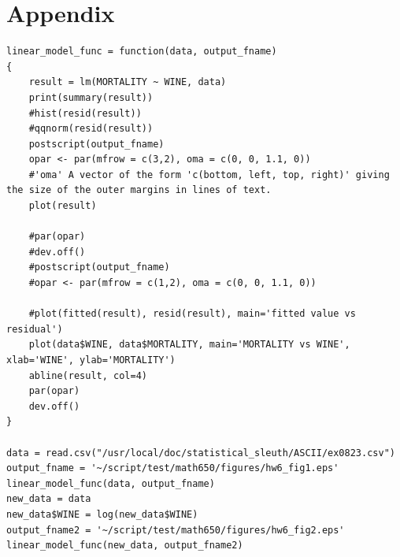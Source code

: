 \documentclass[a4paper,10pt]{article}
\begin{document}
\section{Appendix}
\label{appendix}
\begin{verbatim}
linear_model_func = function(data, output_fname)
{
	result = lm(MORTALITY ~ WINE, data)
	print(summary(result))
	#hist(resid(result))
	#qqnorm(resid(result))
	postscript(output_fname)
	opar <- par(mfrow = c(3,2), oma = c(0, 0, 1.1, 0))
	#'oma' A vector of the form 'c(bottom, left, top, right)' giving the size of the outer margins in lines of text.
	plot(result)
	
	#par(opar)
	#dev.off()
	#postscript(output_fname)
	#opar <- par(mfrow = c(1,2), oma = c(0, 0, 1.1, 0))
	
	#plot(fitted(result), resid(result), main='fitted value vs residual')
	plot(data$WINE, data$MORTALITY, main='MORTALITY vs WINE', xlab='WINE', ylab='MORTALITY')
	abline(result, col=4)
	par(opar)
	dev.off()
}

data = read.csv("/usr/local/doc/statistical_sleuth/ASCII/ex0823.csv")
output_fname = '~/script/test/math650/figures/hw6_fig1.eps'
linear_model_func(data, output_fname)
new_data = data
new_data$WINE = log(new_data$WINE)
output_fname2 = '~/script/test/math650/figures/hw6_fig2.eps'
linear_model_func(new_data, output_fname2)
\end{verbatim}
\end{document}

